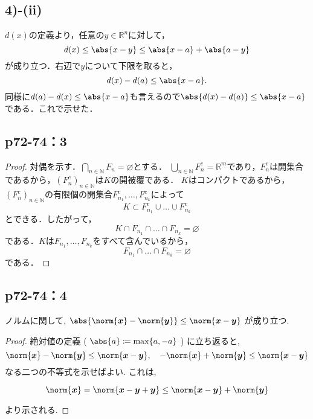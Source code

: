 \documentclass[a4paper,10pt,fleqn]{ltjsarticle}
\begin{document}
\subsection*{4)-(ii)}
  \begin{leftbar}
    $d(x)$の定義より，任意の$y \in \mathbb{R} ^n$に対して，
    \[
      d(x) \leq \abs{x-y} \leq \abs{x-a} + \abs{a-y}
    \]
    が成り立つ．右辺で$y$について下限を取ると，
    \[
      d(x) - d(a) \leq \abs{x-a}.
    \]
    同様に$d(a) - d(x) \leq \abs{x-a}$も言えるので$\abs{d(x) - d(a)} \leq \abs{x-a}$である．これで示せた．
  \end{leftbar}

    \newpage 

    \subsection*{p72-74：3}

    \begin{leftbar}
        \begin{proof}
          対偶を示す．$\bigcap_{n \in \mathbb{N}}F_n = \varnothing$とする．
          $\bigcup_{n \in \mathbb{N}}F_n^c = \mathbb{R}^m$であり，$F_n^c$は開集合であるから，$(F_n^c)_{n \in \mathbb{N}}$は$K$の開被覆である．
          $K$はコンパクトであるから，$(F_n^c)_{n \in \mathbb{N}}$の有限個の開集合$F_{n_1}^c,\ldots,F_{n_k}^c$によって
          \[
            K \subset F_{n_1}^c \cup \ldots \cup F_{n_k}^c
          \]
          とできる．したがって，
          \[
            K \cap F_{n_1} \cap \ldots \cap F_{n_k} = \varnothing
          \]
          である．$K$は$F_{n_1},\ldots,F_{n_k}$をすべて含んでいるから，
          \[
            F_{n_1} \cap \ldots \cap F_{n_k} = \varnothing
          \]
          である．
        \end{proof}
      \end{leftbar}

      \newpage

    \subsection*{p72-74：4}


ノルムに関して, $\abs{\norm{ \bm{x}  }- \norm{ \bm{y} } } \leq \norm{ \bm{x} - \bm{y} }$ が成り立つ. 


\begin{proof} 
	絶対値の定義 ( $\abs{a} \coloneqq \max \{ a , -a \}$ ) に立ち返ると, 
%		
		\[
			\norm{ \bm{x}  }- \norm{ \bm{y} } \leq \norm{ \bm{x} - \bm{y} } ,\quad  - \norm{ \bm{x} } + \norm{ \bm{y} } \leq \norm{ \bm{x} - \bm{y} }
		\]
%		
	なる二つの不等式を示せばよい. これは, 
		
		\[
			\norm{ \bm{x} } = \norm{ \bm{x} - \bm{y} + \bm{y} } \leq \norm{ \bm x - \bm y } + \norm{ \bm{y} }
		\]
		
	より示される.
\end{proof}
\end{document}
